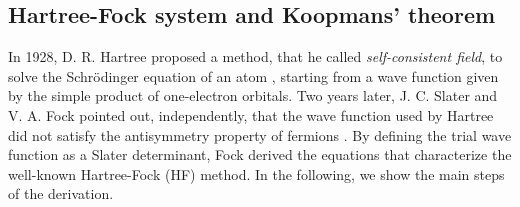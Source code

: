 \subsection{Hartree-Fock system and Koopmans' theorem\label{sec:hartree-fock}}
In 1928, D. R. Hartree proposed a method, that he called \emph{self-consistent field}, to solve the Schr\"{o}dinger equation of an atom \cite{hartree_wave_1928}, starting from a wave function given by the simple product of one-electron orbitals. Two years later, J. C. Slater and V. A. Fock pointed out, independently, that the wave function used by Hartree did not satisfy the antisymmetry property of fermions \cite{slater_note_1930, fock_naherungsmethode_1930}. By defining the trial wave function as a Slater determinant, Fock derived the equations that characterize the well-known Hartree-Fock (HF) method. In the following, we show the main steps of the derivation.

